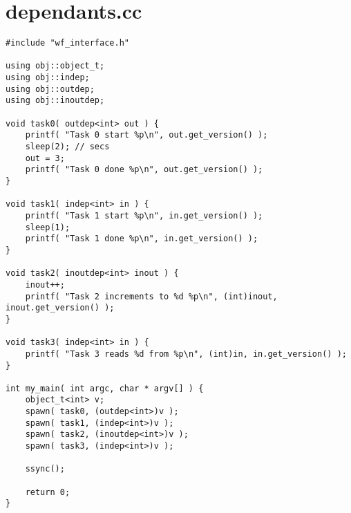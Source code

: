 \newpage
\appendix
\section{dependants.cc} \label{App:dep_code}
\begin{lstlisting}[breaklines, showstringspaces=false]
#include "wf_interface.h"

using obj::object_t;
using obj::indep;
using obj::outdep;
using obj::inoutdep;

void task0( outdep<int> out ) {
    printf( "Task 0 start %p\n", out.get_version() );
    sleep(2); // secs                                                                                             
    out = 3;
    printf( "Task 0 done %p\n", out.get_version() );
}

void task1( indep<int> in ) {
    printf( "Task 1 start %p\n", in.get_version() );
    sleep(1);
    printf( "Task 1 done %p\n", in.get_version() );
}

void task2( inoutdep<int> inout ) {
    inout++;
    printf( "Task 2 increments to %d %p\n", (int)inout, inout.get_version() );
}

void task3( indep<int> in ) {
    printf( "Task 3 reads %d from %p\n", (int)in, in.get_version() );
}

int my_main( int argc, char * argv[] ) {
    object_t<int> v;
    spawn( task0, (outdep<int>)v );
    spawn( task1, (indep<int>)v );
    spawn( task2, (inoutdep<int>)v );
    spawn( task3, (indep<int>)v );

    ssync();

    return 0;
}
\end{lstlisting}
